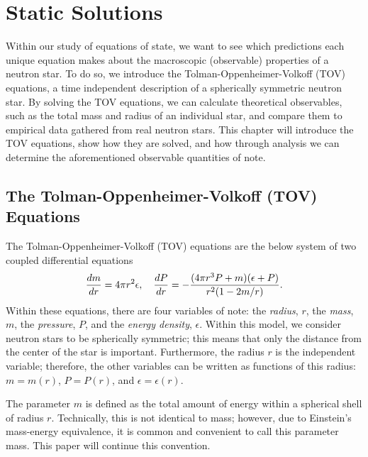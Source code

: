 \chapter{Static Solutions}

Within our study of equations of state, we want to see which predictions each unique equation makes about the macroscopic (observable) properties of a neutron star. To do so, we introduce the Tolman-Oppenheimer-Volkoff (TOV) equations, a time independent description of a spherically symmetric neutron star. By solving the TOV equations, we can calculate theoretical observables, such as the total mass and radius of an individual star, and compare them to empirical data gathered from real neutron stars. This chapter will introduce the TOV equations, show how they are solved, and how through analysis we can determine the aforementioned observable quantities of note.

\section{The Tolman-Oppenheimer-Volkoff (TOV) Equations}

The Tolman-Oppenheimer-Volkoff (TOV) equations are the below system of two coupled differential equations
\begin{align}\label{eqn: tov}
    \dv{m}{r} = 4\pi r^2 \epsilon, \quad \dv{P}{r} = -\frac{(4\pi r^3 P + m)(\epsilon + P)}{r^2 (1-2m/r)}.
\end{align}
Within these equations, there are four variables of note: the \textit{radius}, $r$, the \textit{mass}, $m$, the \textit{pressure}, $P$, and the \textit{energy density}, $\epsilon$. Within this model, we consider neutron stars to be spherically symmetric; this means that only the distance from the center of the star is important. Furthermore, the radius $r$ is the independent variable; therefore, the other variables can be written as functions of this radius: $m=m(r)$, $P=P(r)$, and $\epsilon=\epsilon(r)$.

The parameter $m$ is defined as the total amount of energy within a spherical shell of radius $r$. Technically, this is not identical to mass; however, due to Einstein's mass-energy equivalence, it is common and convenient to call this parameter mass. This paper will continue this convention. 

